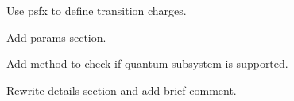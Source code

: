 \begin{DoxyRefList}
\begin{DoxyItemize}
\item Use psfx to define transition charges.
\item Add params section.  
\end{DoxyItemize}
\item[\label{todo__todo000005}%
\Hypertarget{todo__todo000005}%
Subprogram \hyperlink{namespacespectrometer__class_ad2c4936524c8702e1c4e53a54a043f31}{spectrometer\+\_\+class\+:\+:get\+\_\+abspectrum} (this, qs, cs, cp, tol, samples, file)]
\begin{DoxyItemize}
\item Add method to check if quantum subsystem is supported.
\item Rewrite details section and add brief comment. 
\end{DoxyItemize}
\end{DoxyRefList}